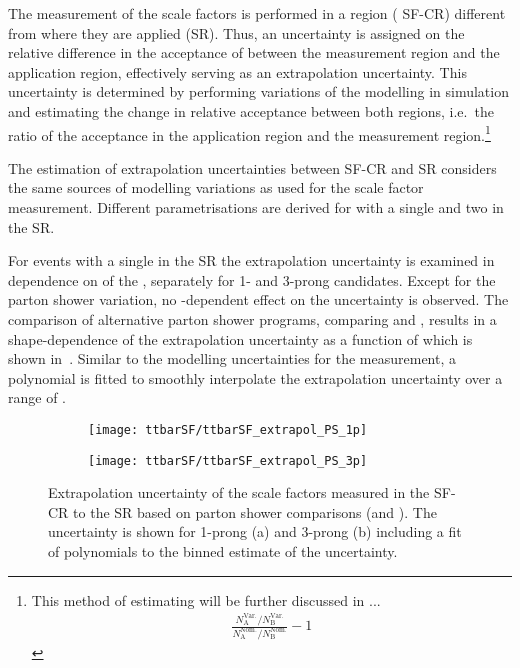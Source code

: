The measurement of the scale factors is performed in a region (\lephad
SF-CR) different from where they are applied (\hadhad SR). Thus, an
uncertainty is assigned on the relative difference in the acceptance
of \ttbarFakes between the measurement region and the application
region, effectively serving as an extrapolation uncertainty. This
uncertainty is determined by performing variations of the \ttbar
modelling in simulation and estimating the change in relative
acceptance between both regions, i.e.\ the ratio of the acceptance in
the application region and the measurement region.\footnote{This method
  of estimating will be further discussed in ...
  \begin{align*}
    \frac{N_\text{A}^\text{Var.} / N_\text{B}^\text{Var.}}{N_\text{A}^\text{Nom.} / N_\text{B}^\text{Nom.}} - 1
  \end{align*}
}

The estimation of extrapolation uncertainties between SF-CR and
\hadhad SR considers the same sources of \ttbar modelling variations
as used for the scale factor measurement. Different parametrisations
are derived for \ttbar with a single \faketauhadvis and two
\faketauhadvis in the \hadhad SR.

For \ttbar events with a single \faketauhadvis in the \hadhad SR the
extrapolation uncertainty is examined in dependence on \pT of the
\faketauhadvis, separately for 1- and 3-prong candidates. Except for
the parton shower variation, no \pT-dependent effect on the
uncertainty is observed.  The comparison of alternative parton shower
programs, comparing \PYTHIA[8] and \HERWIG[7], results in a
shape-dependence of the extrapolation uncertainty as a function of
\tauhadvis \pT which is shown in~.
Similar to the modelling uncertainties for the measurement, a
polynomial is fitted to smoothly interpolate the extrapolation
uncertainty over a range of \tauhadvis \pT. 

\begin{figure}[htbp]
  \centering

  \begin{subfigure}[t]{.495\textwidth}
    \texttt{[image: ttbarSF/ttbarSF\_extrapol\_PS\_1p]}
    \caption{}
    \label{fig:ttbarSF_extrapol_shape_a}
  \end{subfigure}\hfill%
  \begin{subfigure}[t]{.495\textwidth}
    \texttt{[image: ttbarSF/ttbarSF\_extrapol\_PS\_3p]}
    \caption{}
    \label{fig:ttbarSF_extrapol_shape_b}
  \end{subfigure}

  \caption{Extrapolation uncertainty of the scale factors measured in
    the SF-CR to the \hadhad SR based on parton shower comparisons
    (\PYTHIA[8] and \HERWIG[7]). The uncertainty is shown for 1-prong
    (a) and 3-prong \faketauhadvis (b) including a fit of polynomials
    to the binned estimate of the uncertainty. }
  \label{fig:ttbarSF_extrapol_shape}
\end{figure}

